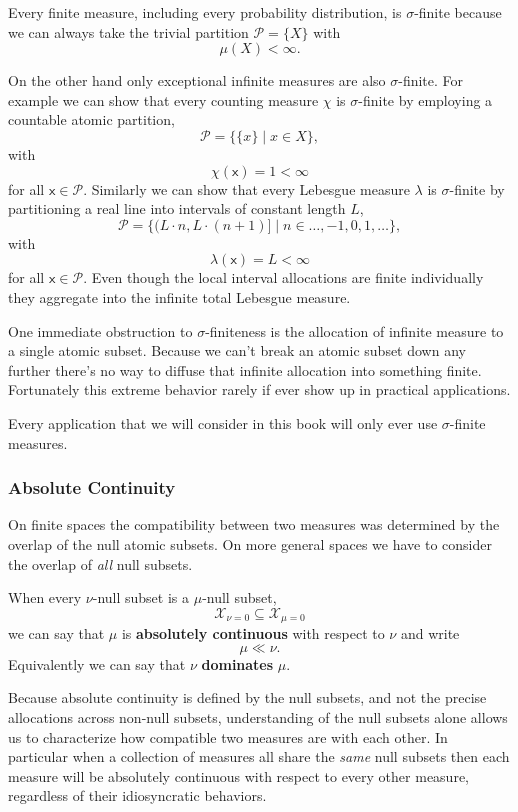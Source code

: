 \documentclass[
  letterpaper,
  DIV=11,
  numbers=noendperiod]{scrartcl}
\begin{document}
Every finite measure, including every probability distribution, is
\(\sigma\)-finite because we can always take the trivial partition
\(\mathcal{P} = \{ X \}\) with \[
\mu(X) < \infty.
\]

On the other hand only exceptional infinite measures are also
\(\sigma\)-finite. For example we can show that every counting measure
\(\chi\) is \(\sigma\)-finite by employing a countable atomic partition,
\[
\mathcal{P} = \{ \{ x \} \mid x \in X \},
\] with \[
\chi( \mathsf{x} ) = 1 < \infty
\] for all \(\mathsf{x} \in \mathcal{P}\). Similarly we can show that
every Lebesgue measure \(\lambda\) is \(\sigma\)-finite by partitioning
a real line into intervals of constant length \(L\), \[
\mathcal{P} =
\{ ( L \cdot n, L \cdot (n + 1) ] \mid n \in \ldots, -1, 0, 1, \ldots \},
\] with \[
\lambda( \mathsf{x} ) = L < \infty
\] for all \(\mathsf{x} \in \mathcal{P}\). Even though the local
interval allocations are finite individually they aggregate into the
infinite total Lebesgue measure.

One immediate obstruction to \(\sigma\)-finiteness is the allocation of
infinite measure to a single atomic subset. Because we can't break an
atomic subset down any further there's no way to diffuse that infinite
allocation into something finite. Fortunately this extreme behavior
rarely if ever show up in practical applications.

Every application that we will consider in this book will only ever use
\(\sigma\)-finite measures.

\hypertarget{absolute-continuity}{%
\subsubsection{Absolute Continuity}\label{absolute-continuity}}

On finite spaces the compatibility between two measures was determined
by the overlap of the null atomic subsets. On more general spaces we
have to consider the overlap of \emph{all} null subsets.

When every \(\nu\)-null subset is a \(\mu\)-null subset, \[
\mathcal{X}_{\nu = 0} \subseteq \mathcal{X}_{\mu = 0}
\] we can say that \(\mu\) is \textbf{absolutely continuous} with
respect to \(\nu\) and write \[
\mu \ll \nu.
\] Equivalently we can say that \(\nu\) \textbf{dominates} \(\mu\).

Because absolute continuity is defined by the null subsets, and not the
precise allocations across non-null subsets, understanding of the null
subsets alone allows us to characterize how compatible two measures are
with each other. In particular when a collection of measures all share
the \emph{same} null subsets then each measure will be absolutely
continuous with respect to every other measure, regardless of their
idiosyncratic behaviors.
\end{document}
